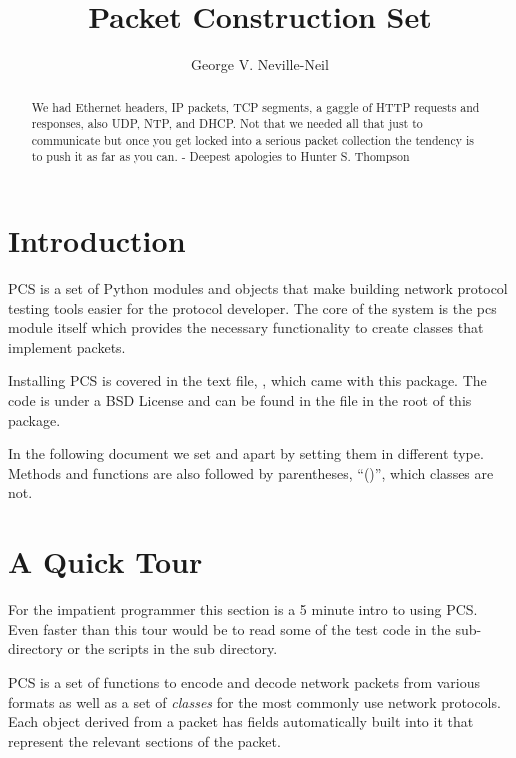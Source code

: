 \documentclass[11pt]{article}
\title{Packet Construction Set}
\author{George V. Neville-Neil}
\begin{document}
\maketitle
\tableofcontents
\begin{abstract}
  We had Ethernet headers, IP packets, TCP segments, a gaggle of HTTP
  requests and responses, also UDP, NTP, and DHCP. Not that we needed
  all that just to communicate but once you get locked into a serious
  packet collection the tendency is to push it as far as you can. -
  Deepest apologies to Hunter S. Thompson
\end{abstract}
\section{Introduction}

PCS is a set of Python modules and objects that make building network
protocol testing tools easier for the protocol developer.  The core of
the system is the pcs module itself which provides the necessary
functionality to create classes that implement packets.

Installing PCS is covered in the text file, , which came
with this package.  The code is under a BSD License and can be found
in the file  in the root of this package.

In the following document we set  
 and  apart by setting them in
different type.  Methods and functions are also followed by
parentheses, ``()'', which classes are not.


\section{A Quick Tour}

For the impatient programmer this section is a 5 minute intro to using
PCS.  Even faster than this tour would be to read some of the test
code in the  sub-directory or the scripts in the
 sub directory.

PCS is a set of functions to encode and decode network packets from
various formats as well as a set of \emph{classes} for the most
commonly use network protocols.  Each object derived from a packet has
fields automatically built into it that represent the relevant
sections of the packet.  
\end{document}
